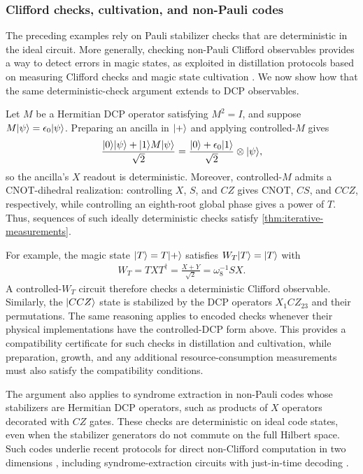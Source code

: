 \subsubsection{Clifford checks, cultivation, and non-Pauli codes}

The preceding examples rely on Pauli stabilizer checks that are deterministic in the ideal circuit.
More generally, checking non-Pauli Clifford observables provides a way to detect errors in magic states, as exploited in distillation protocols based on measuring Clifford checks \cite{jones2013multilevel, knill2004faulttolerant, meier2012magicstate,haah2017magic,haah2018codes} and magic state cultivation \cite{chamberland2020very, gidney2024magic, vaknin2026high}.
We now show how that the same deterministic-check argument extends to DCP observables.

Let $M$ be a Hermitian DCP operator satisfying $M^2=I$, and suppose $M|\psi\rangle=\epsilon_0|\psi\rangle$.
Preparing an ancilla in $|+\rangle$ and applying controlled-$M$ gives
\begin{align}
    \frac{|0\rangle|\psi\rangle+|1\rangle M|\psi\rangle}{\sqrt{2}}
    =
    \frac{|0\rangle+\epsilon_0|1\rangle}{\sqrt{2}}\otimes|\psi\rangle,
\end{align}
so the ancilla's $X$ readout is deterministic.
Moreover, controlled-$M$ admits a CNOT-dihedral realization: controlling $X$, $S$, and $CZ$ gives CNOT, $CS$, and $CCZ$, respectively, while controlling an eighth-root global phase gives a power of $T$.
Thus, sequences of such ideally deterministic checks satisfy \cref{thm:iterative-measurements}.

For example, the magic state $|T\rangle=T|+\rangle$ satisfies $W_T|T\rangle=|T\rangle$ with
\begin{align}
    W_T=TXT^\dagger=\frac{X+Y}{\sqrt{2}}=\omega_8^{-1}SX.
\end{align}
A controlled-$W_T$ circuit therefore checks a deterministic Clifford observable.
Similarly, the $|CCZ\rangle$ state is stabilized by the DCP operators $X_1CZ_{23}$ and their permutations.
The same reasoning applies to encoded checks whenever their physical implementations have the controlled-DCP form above.
This provides a compatibility certificate for such checks in distillation and cultivation, while preparation, growth, and any additional resource-consumption measurements must also satisfy the compatibility conditions.

The argument also applies to syndrome extraction in non-Pauli codes whose stabilizers are Hermitian DCP operators, such as products of $X$ operators decorated with $CZ$ gates.
These checks are deterministic on ideal code states, even when the stabilizer generators do not commute on the full Hilbert space.
Such codes underlie recent protocols for direct non-Clifford computation in two dimensions \cite{davydova2026universal}, including syndrome-extraction circuits with just-in-time decoding \cite{bauer2026planar, davydova2026universal, fuente2026highthreshold}.

